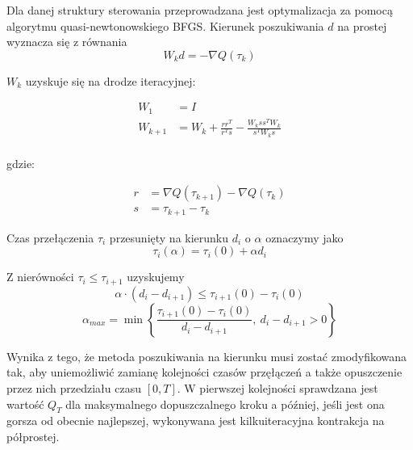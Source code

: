 \documentclass[11pt]{mwart}
\begin{document}
Dla danej struktury sterowania przeprowadzana jest optymalizacja za pomocą algorytmu quasi-newtonowskiego BFGS. Kierunek poszukiwania $d$ na prostej wyznacza się z równania 
\begin{equation}
	W_{k}d=-\nabla Q\left(\tau_{k}\right)
\end{equation}

$W_{k}$ uzyskuje się na drodze iteracyjnej:

\begin{equation}
	\label{eq-bfgs}
	\begin{split}
		W_{1} &= I \\
		W_{k+1} &= W_{k} + \frac{rr^{T}}{r^{T}s}-\frac{W_{k}ss^{T}W_{k}}{s^{T}W_{k}s} \\
	\end{split}
\end{equation}

gdzie:

\begin{equation}
	\label{eq-rs}
	\begin{split}
		r &= \nabla Q\left(\tau_{k+1}\right)-\nabla Q\left(\tau_{k}\right) \\
		s &= \tau_{k+1} - \tau_{k}
	\end{split}
\end{equation}

Czas przełączenia $\tau_{i}$ przesunięty na kierunku $d_{i}$ o $\alpha$ oznaczymy jako
\begin{equation}
	\tau_{i}\left(\alpha\right)=\tau_{i}\left(0\right)+\alpha d_{i}
\end{equation}

Z nierówności $\tau_{i}\leq\tau_{i+1}$ uzyskujemy
\begin{equation}
	\alpha\cdot\left(d_{i}-d_{i+1}\right)\leq\tau_{i+1}\left(0\right)-\tau_{i}\left(0\right)
\end{equation}
\begin{equation}
	\alpha_{max} = \min\left\{\frac{\tau_{i+1}\left(0\right)-\tau_{i}\left(0\right)}{d_{i}-d_{i+1}},\ d_{i}-d_{i+1}>0\right\}
\end{equation}

Wynika z tego, że metoda poszukiwania na kierunku musi zostać zmodyfikowana tak, aby uniemożliwić zamianę kolejności czasów przęłączeń a także opuszczenie przez nich przedziału czasu $[0,T]$. W pierwszej kolejności sprawdzana jest wartość $Q_{T}$ dla maksymalnego dopuszczalnego kroku a później, jeśli jest ona gorsza od obecnie najlepszej, wykonywana jest kilkuiteracyjna kontrakcja na półprostej.
\end{document}
